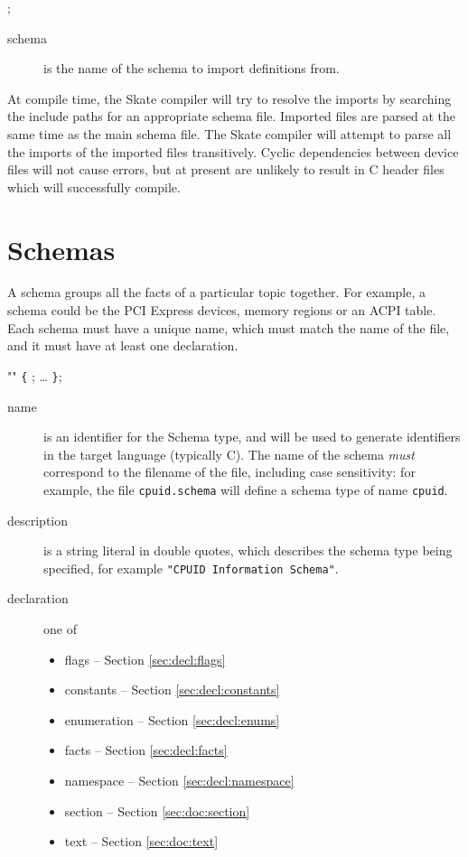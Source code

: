 \documentclass[a4paper,11pt,twoside]{report}
\begin{document}
{{\begin{syntax}
 ;
\end{syntax}

\begin{description}
\item[schema] is the name of the schema to import definitions from.  
\end{description}

At compile time, the Skate compiler will try to resolve the imports by 
searching the include paths for an appropriate schema file. Imported files
are parsed at the same time as the main schema file. The Skate compiler will
attempt to parse all the imports of the imported files transitively. 
Cyclic dependencies between device files will not cause errors, but at present 
are unlikely to result in C header files which will successfully compile. 

\section{Schemas}\label{sec:decl:schema}

A schema groups all the facts of a particular topic together. For example, 
a schema could be the PCI Express devices, memory regions or an ACPI table. 
Each schema must have a unique name, which must match the name of the file, and
it must have at least one declaration.

\begin{syntax}
  "" \verb+{+
  ;
  \ldots
\verb+}+;
\end{syntax}

\begin{description}
\item[name] is an identifier for the Schema type, and will be used to
  generate identifiers in the target language (typically C).  
  The name of the schema \emph{must} correspond to the
  filename of the file, including case sensitivity: for example, 
  the file \texttt{cpuid.schema} will define a schema type
  of name \texttt{cpuid}. 

\item [description] is a string literal in double quotes, which
  describes the schema type being specified, for example \texttt{"CPUID 
  Information Schema"}. 

\item [declaration] one of 
    \begin{itemize}
        \item flags -- Section \ref{sec:decl:flags}
        \item constants -- Section \ref{sec:decl:constants}
        \item enumeration -- Section \ref{sec:decl:enums}
        \item facts -- Section \ref{sec:decl:facts}
        \item namespace -- Section \ref{sec:decl:namespace}
        \item section -- Section \ref{sec:doc:section}
        \item text -- Section \ref{sec:doc:text}
    \end{itemize}



\end{description}}}
\end{document}
